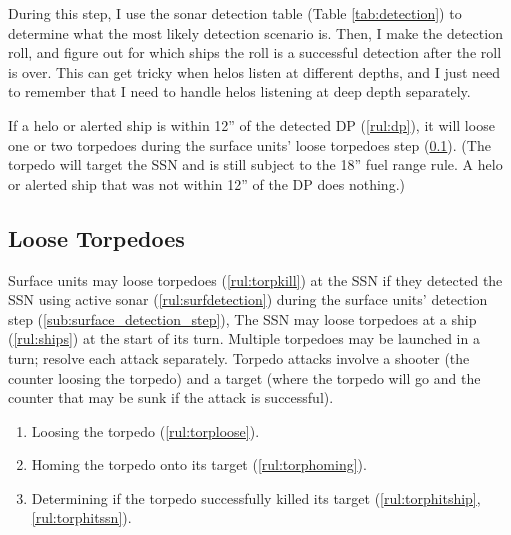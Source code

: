 \documentclass[../TacSubMicroRules.tex]{subfiles}
\begin{document}
\begin{design}
    During this step, I use the sonar detection table (Table \ref{tab:detection}) to determine what the most likely detection scenario is.
    Then, I make the detection roll, and figure out for which ships the roll is a successful detection after the roll is over.
    This can get tricky when helos listen at different depths, and I just need to remember that I need to handle helos listening at deep depth separately.
\end{design}

 
If a helo or alerted ship is within 12'' of the detected DP (\ref{rul:dp}), it will loose one or two torpedoes during the surface units' loose torpedoes step (\ref{sub:loose_torpedoes}).
(The torpedo will target the SSN and is still subject to the 18'' fuel range rule.
A helo or alerted ship that was not within 12'' of the DP does nothing.)

\subsection{Loose Torpedoes}%
\label{sub:loose_torpedoes}

Surface units may loose torpedoes (\ref{rul:torpkill}) at the SSN if they detected the SSN using active sonar (\ref{rul:surfdetection}) during the surface units' detection step (\ref{sub:surface_detection_step}),
The SSN may loose torpedoes at a ship (\ref{rul:ships}) at the start of its turn.
Multiple torpedoes may be launched in a turn; resolve each attack separately.
Torpedo attacks involve a shooter (the counter loosing the torpedo) and a target (where the torpedo will go and the counter that may be sunk if the attack is successful).
\begin{enumerate}
    \item Loosing the torpedo (\ref{rul:torploose}).
    \item Homing the torpedo onto its target (\ref{rul:torphoming}).
    \item Determining if the torpedo successfully killed its target (\ref{rul:torphitship}, \ref{rul:torphitssn}).
\end{enumerate}
\end{document}
